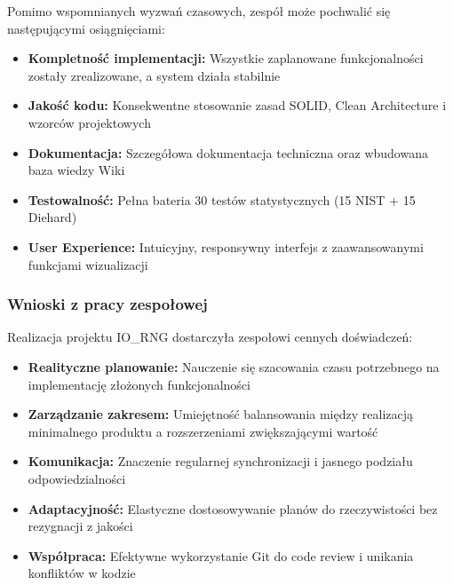 \documentclass[12pt,a4paper]{article}
\begin{document}
Pomimo wspomnianych wyzwań czasowych, zespół może pochwalić się następującymi osiągnięciami:

\begin{itemize}
    \item \textbf{Kompletność implementacji:} Wszystkie zaplanowane funkcjonalności zostały zrealizowane, a system działa stabilnie
    
    \item \textbf{Jakość kodu:} Konsekwentne stosowanie zasad SOLID, Clean Architecture i wzorców projektowych
    
    \item \textbf{Dokumentacja:} Szczegółowa dokumentacja techniczna oraz wbudowana baza wiedzy Wiki
    
    \item \textbf{Testowalność:} Pełna bateria 30 testów statystycznych (15 NIST + 15 Diehard)
    
    \item \textbf{User Experience:} Intuicyjny, responsywny interfejs z zaawansowanymi funkcjami wizualizacji
    
\end{itemize}

\subsubsection{Wnioski z pracy zespołowej}

Realizacja projektu IO\_RNG dostarczyła zespołowi cennych doświadczeń:

\begin{itemize}
    \item \textbf{Realityczne planowanie:} Nauczenie się szacowania czasu potrzebnego na implementację złożonych funkcjonalności
    
    \item \textbf{Zarządzanie zakresem:} Umiejętność balansowania między realizacją minimalnego produktu a rozszerzeniami zwiększającymi wartość
    
    \item \textbf{Komunikacja:} Znaczenie regularnej synchronizacji i jasnego podziału odpowiedzialności
    
    \item \textbf{Adaptacyjność:} Elastyczne dostosowywanie planów do rzeczywistości bez rezygnacji z jakości
    
    \item \textbf{Współpraca:} Efektywne wykorzystanie Git do code review i unikania konfliktów w kodzie
\end{itemize}
\end{document}
